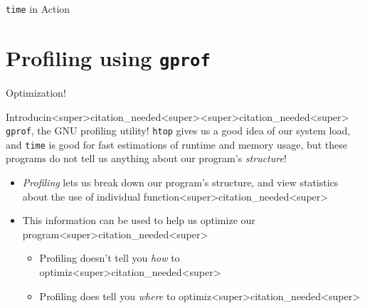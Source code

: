 \documentclass[11pt]{beamer}
\begin{document}
\begin{frame}{\texttt{time} in Action}
\center
\
\end{frame}

\section[gprof]{Profiling using \texttt{gprof}}
\begin{frame}{Optimization!}
\center
\
\end{frame}

\begin{frame}{Introducin<super>citation_needed<super><super>citation_needed<super> \texttt{gprof}, the GNU profiling utility!}
\texttt{htop} gives us a good idea of our system load, and \texttt{time} is good for fast estimations of runtime and memory usage, but these programs do not tell us anything about our program's \emph{structure}!
\begin{itemize}
\item \textit{Profiling} lets us break down our program's structure, and view statistics about the use of individual function<super>citation_needed<super>  
\item This information can be used to help us optimize our program<super>citation_needed<super>
\begin{itemize}
\item Profiling doesn't tell you \emph{how} to optimiz<super>citation_needed<super>
\item Profiling does tell you \emph{where} to optimiz<super>citation_needed<super>
\end{itemize}
\end{itemize}
\end{frame}
\end{document}
